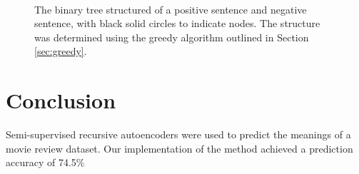 \documentclass{article}
\begin{document}
\begin{figure}[t]
    \centering
    \mbox{ \quad
        }
    \caption{The binary tree structured of a positive sentence and negative sentence, with black solid circles to indicate nodes. The structure was determined using the greedy algorithm outlined in Section \ref{sec:greedy}.}
    \label{fig:tree}
\end{figure}


\section{Conclusion}
Semi-supervised recursive autoencoders were used to predict the meanings of a movie review dataset. Our implementation of the method achieved a prediction accuracy of 74.5\%




\small{


}
\end{document}
